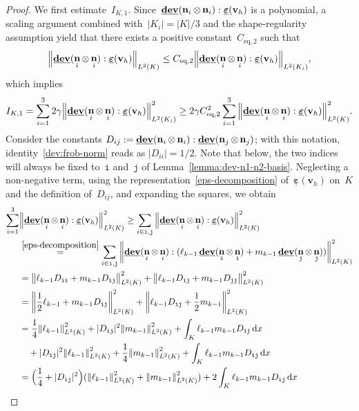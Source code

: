 \documentclass[10pt,a4paper]{amsart}
\newcommand{\Ceqtwo}{C_{\text{eq},2}}
\newcommand{\IKone}{I_{\K,1}}
\newcommand{\K}{K}
\newcommand{\Ki}{{\K_i}}
\newcommand{\Ltwo}{L^2}
\newcommand{\Norm}[1]{{\left\|{#1} \right\|}}
\DeclareMathOperator{\dev}{\underline{\mathbf{dev}}}
\newcommand{\dx}{\, \mathrm{d}x}
\newcommand{\epsbfun}{\underline{\boldsymbol{\varepsilon}}}
\newcommand{\itt}{\mathtt{i}}
\newcommand{\jtt}{\mathtt{j}}
\newcommand{\lkmo}{\ell_{k-1}}
\newcommand{\mkmo}{m_{k-1}}
\DeclareMathOperator{\norm}{\bf{n}}
\newcommand{\normi}{\norm_i}
\newcommand{\normitt}{\norm_{\itt}}
\newcommand{\normj}{\norm_j}
\newcommand{\normjtt}{\norm_{\jtt}}
\newcommand{\vbfh}{\mathbf{v}_h}
\begin{document}
\begin{proof}
We first estimate~$\IKone$.
Since~$\dev(\normi\otimes\normi):\epsbfun(\vbfh)$ is a polynomial,
a scaling argument combined with~$|\Ki|=|K|/3$
and the shape-regularity assumption
yield
that there exists a positive constant~$\Ceqtwo$ such that
\begin{equation*}
\Norm{\dev(\normi\otimes\normi):\epsbfun(\vbfh)}_{\Ltwo(\K)}
\leq \Ceqtwo \Norm{\dev(\normi\otimes\normi):\epsbfun(\vbfh)}_{\Ltwo(\Ki)},
\end{equation*}
which implies
\begin{equation} \label{IKone:first-estimate}
\IKone 
= \sum_{i=1}^3 2\gamma
  \Norm{\dev(\normi\otimes\normi):\epsbfun(\vbfh)}_{\Ltwo(\Ki)}^2
\geq 2\gamma\Ceqtwo^2 \sum_{i=1}^3  
  \Norm{\dev(\normi\otimes\normi):\epsbfun(\vbfh)}_{\Ltwo(\K)}^2.
\end{equation}
Consider the constants
$D_{ij} := \dev(\normi\otimes\normi):\dev(\normj\otimes\normj)$;
with this notation,
identity~\eqref{dev:frob-norm} reads as $|D_{ii}|=1/2$.
Note that below,
the two indices will always be fixed to~$\itt$ and~$\jtt$ of Lemma~\ref{lemma:dev-n1-n2-basis}.
Neglecting a non-negative term,
using the representation~\eqref{eps-decomposition} of~$\epsbfun(\vbfh)$ on~$\K$
and the definition of~$D_{ij}$,
and expanding the squares,
we obtain
\begin{equation} \label{sumdev-eps}
\begin{split}
\sum_{i = 1}^3&\Norm{\dev(\normi\otimes\normi):\epsbfun(\vbfh)}_{\Ltwo(\K)}^2 
\geq \sum_{i \in\itt,\jtt}\Norm{\dev(\normi\otimes\normi):\epsbfun(\vbfh)}_{\Ltwo(\K)}^2 \\
&\overset{\eqref{eps-decomposition}}{=} 
\sum_{i \in\itt,\jtt}\Norm{\dev(\normi\otimes\normi):(\lkmo\dev(\normitt\otimes\normitt)+\mkmo\dev(\normjtt\otimes\normjtt))}_{\Ltwo(\K)}^2 \\
&=\Norm{\lkmo D_{\itt\itt} + \mkmo D_{\itt\jtt}}_{\Ltwo(\K)}^2 
     + \Norm{\lkmo D_{\itt\jtt}+ \mkmo D_{\jtt\jtt}}_{\Ltwo(\K)}^2 \\
&=\Norm{\frac12\lkmo + \mkmo D_{\itt\jtt}}_{\Ltwo(\K)}^2 
     + \Norm{\lkmo D_{\itt\jtt}+ \frac12\mkmo}_{\Ltwo(\K)}^2 \\
&= \frac14\Norm{\lkmo}^2_{\Ltwo(\K)} + |D_{\itt\jtt}|^2\Norm{\mkmo}^2_{\Ltwo(\K)} + \int_\K\lkmo\mkmo D_{\itt\jtt}\dx \\
        &\quad +|D_{\itt\jtt}|^2\Norm{\lkmo}^2_{\Ltwo(\K)} + \frac14\Norm{\mkmo}^2_{\Ltwo(\K)} +\int_\K\lkmo\mkmo D_{\itt\jtt}\dx \\
&=\Big(\frac14+|D_{\itt\jtt}|^2\Big)(\Norm{\lkmo}^2_{\Ltwo(\K)} + \Norm{\mkmo}^2_{\Ltwo(\K)})+ 2\int_\K\lkmo\mkmo D_{\itt\jtt}\dx \\

\end{split}
\end{equation}
\end{proof}
\end{document}
